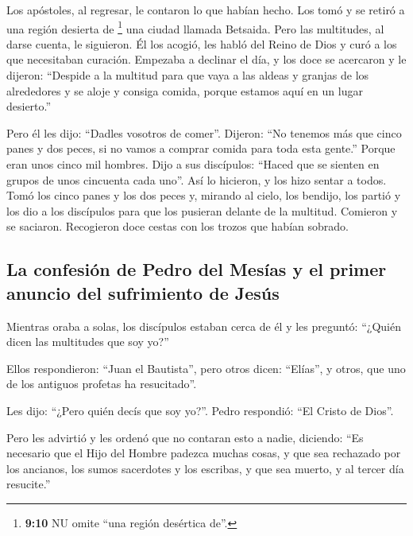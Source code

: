 \begin{paracol}{2}
 Los apóstoles, al regresar, le contaron lo que habían
hecho. Los tomó y se retiró a una región desierta de \footnote{\textbf{9:10}
  NU omite ``una región desértica de''.} una ciudad llamada Betsaida.
 Pero las multitudes, al darse cuenta, le siguieron. Él
los acogió, les habló del Reino de Dios y curó a los que necesitaban
curación.  Empezaba a declinar el día, y los doce se
acercaron y le dijeron: ``Despide a la multitud para que vaya a las
aldeas y granjas de los alrededores y se aloje y consiga comida, porque
estamos aquí en un lugar desierto.''

 Pero él les dijo: ``Dadles vosotros de comer''. Dijeron:
``No tenemos más que cinco panes y dos peces, si no vamos a comprar
comida para toda esta gente.''  Porque eran unos cinco
mil hombres. Dijo a sus discípulos: ``Haced que se sienten en grupos de
unos cincuenta cada uno''.  Así lo hicieron, y los hizo
sentar a todos.  Tomó los cinco panes y los dos peces y,
mirando al cielo, los bendijo, los partió y los dio a los discípulos
para que los pusieran delante de la multitud.  Comieron y
se saciaron. Recogieron doce cestas con los trozos que habían sobrado.

\hypertarget{la-confesiuxf3n-de-pedro-del-mesuxedas-y-el-primer-anuncio-del-sufrimiento-de-jesuxfas}{%
\subsection{La confesión de Pedro del Mesías y el primer anuncio del
sufrimiento de
Jesús}\label{la-confesiuxf3n-de-pedro-del-mesuxedas-y-el-primer-anuncio-del-sufrimiento-de-jesuxfas}}

 Mientras oraba a solas, los discípulos estaban cerca de
él y les preguntó: ``¿Quién dicen las multitudes que soy yo?''

 Ellos respondieron: ``Juan el Bautista'', pero otros
dicen: ``Elías'', y otros, que uno de los antiguos profetas ha
resucitado''.

 Les dijo: ``¿Pero quién decís que soy yo?''. Pedro
respondió: ``El Cristo de Dios''.

 Pero les advirtió y les ordenó que no contaran esto a
nadie,  diciendo: ``Es necesario que el Hijo del Hombre
padezca muchas cosas, y que sea rechazado por los ancianos, los sumos
sacerdotes y los escribas, y que sea muerto, y al tercer día resucite.''


\end{paracol}
